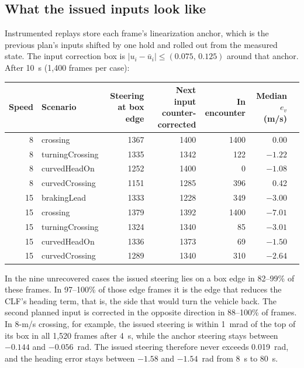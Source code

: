 \documentclass[11pt]{article}
\begin{document}
\subsection{What the issued inputs look like}
Instrumented replays store each frame's linearization anchor, which is the
previous plan's inputs shifted by one hold and rolled out from the measured
state. The input correction box is $|u_i-\bar u_i|\le(0.075,\,0.125)$ around
that anchor. After 10~s (1{,}400 frames per case):
\begin{center}\footnotesize
\begin{tabular}{rlrrrrr}
\toprule
Speed & Scenario & Steering at box edge & Next input counter-corrected & In encounter & Median $e_v$ (m/s)\\
\midrule
8 & crossing & 1367 & 1400 & 1400 & 0.00\\
8 & turningCrossing & 1335 & 1342 & 122 & $-1.22$\\
8 & curvedHeadOn & 1252 & 1400 & 0 & $-1.08$\\
8 & curvedCrossing & 1151 & 1285 & 396 & 0.42\\
15 & brakingLead & 1333 & 1228 & 349 & $-3.00$\\
15 & crossing & 1379 & 1392 & 1400 & $-7.01$\\
15 & turningCrossing & 1324 & 1340 & 85 & $-3.01$\\
15 & curvedHeadOn & 1336 & 1373 & 69 & $-1.50$\\
15 & curvedCrossing & 1289 & 1340 & 310 & $-2.64$\\
\bottomrule
\end{tabular}\end{center}
In the nine unrecovered cases the issued steering lies on a box edge in
82--99\% of these frames. In 97--100\% of those edge frames it is the edge that
reduces the CLF's heading term, that is, the side that would turn the vehicle
back. The second planned input is corrected in the opposite direction in
88--100\% of frames. In 8-m/s crossing, for example, the issued steering is
within 1~mrad of the top of its box in all 1{,}520 frames after 4~s, while the
anchor steering stays between $-0.144$ and $-0.056$~rad. The issued steering
therefore never exceeds 0.019~rad, and the heading error stays between
$-1.58$ and $-1.54$~rad from 8~s to 80~s.
\end{document}
